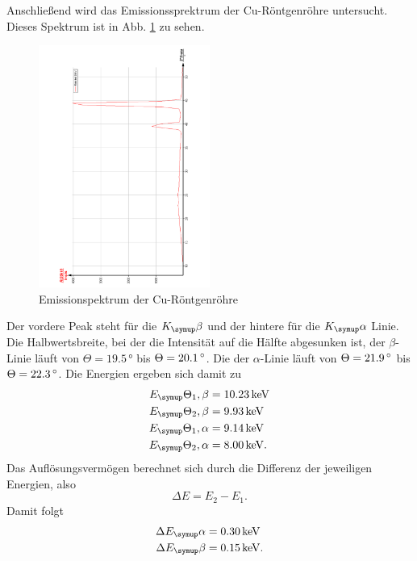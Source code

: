 Anschließend wird das Emissionssprektrum der Cu-Röntgenröhre untersucht.
Dieses Spektrum ist in Abb. \ref{fig:EmissionCu} zu sehen.
\begin{figure}
  \centering
  \includegraphics[width=0.5\textwidth, angle=270]{bilder/EmissionCu.pdf}
  \caption{Emissionspektrum der Cu-Röntgenröhre}
  \label{fig:EmissionCu}
\end{figure}
Der vordere Peak steht für die $K_\su{\beta}$ und der hintere für die $K_\su{\alpha}$
Linie. Die Halbwertsbreite, bei der die Intensität auf die Hälfte abgesunken ist,
der $\beta$-Linie läuft von $\Theta = 19.5\,\si{\degree}$ bis $\Theta = 20.1\,\si{\degree}$.
Die der $\alpha$-Linie läuft von $\Theta = 21.9\,\si{\degree}$ bis $\Theta = 22.3\,\si{\degree}$.
Die Energien ergeben sich damit zu
\begin{align}
  E_\su{\Theta_1, \beta} &= 10.23 \keV \\
  E_\su{\Theta_2, \beta} &= 9.93 \keV \\
  E_\su{\Theta_1, \alpha} &= 9.14 \keV \\
  E_\su{\Theta_2, \alpha} &= 8.00 \keV. \\
\end{align}
Das Auflösungsvermögen berechnet sich durch die Differenz der jeweiligen Energien,
also
\begin{equation}
  \Delta E = E_2 - E_1.
\end{equation}
Damit folgt
\begin{align}
  \Delta E_\su{\alpha} &= 0.30 \keV  \\
  \Delta E_\su{\beta} &= 0.15 \keV. \\
\end{align}

